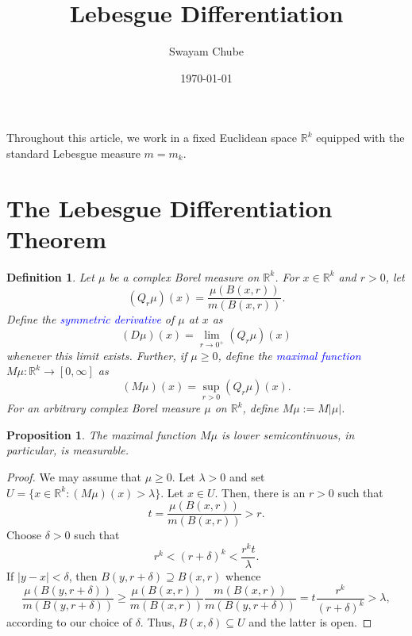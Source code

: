 \documentclass[12pt]{article}
\title{Lebesgue Differentiation}
\author{Swayam Chube}
\date{\today}
\theoremstyle{thmstyle}
\newtheorem{proposition}[theorem]{Proposition}
\theoremstyle{defstyle}
\newtheorem{definition}[theorem]{Definition}
\newcommand{\R}{\mathbb{R}}
\newcommand{\define}[1]{\textcolor{blue}{\textit{#1}}}
\renewcommand{\ge}{\geqslant}
\begin{document}
\maketitle

Throughout this article, we work in a fixed Euclidean space $\R^k$ equipped with the standard Lebesgue measure $m = m_k$.

\section{The Lebesgue Differentiation Theorem}

\begin{definition}
    Let $\mu$ be a complex Borel measure on $\R^k$. For $x\in\R^k$ and $r > 0$, let 
    \begin{equation*}
        (Q_r\mu)(x) = \frac{\mu(B(x, r))}{m(B(x, r))}.
    \end{equation*}
    Define the \define{symmetric derivative} of $\mu$ at $x$ as 
    \begin{equation*}
        (D\mu)(x) = \lim_{r\to 0^+} (Q_r\mu)(x)
    \end{equation*}
    whenever this limit exists. Further, if $\mu\ge 0$, define the \define{maximal function} $M\mu:\R^k\to[0,\infty]$ as 
    \begin{equation*}
        (M\mu)(x) = \sup_{r > 0}(Q_r\mu)(x).
    \end{equation*}
    For an arbitrary complex Borel measure $\mu$ on $\R^k$, \emph{define} $M\mu := M|\mu|$.
\end{definition}

\begin{proposition}
    The maximal function $M\mu$ is lower semicontinuous, in particular, is measurable.
\end{proposition}
\begin{proof}
    We may assume that $\mu\ge 0$. Let $\lambda > 0$ and set $U = \{x\in \R^k\colon (M\mu)(x) > \lambda\}$. Let $x\in U$. Then, there is an $r > 0$ such that 
    \begin{equation*}
        t = \frac{\mu(B(x, r))}{m(B(x, r))} > r.
    \end{equation*}
    Choose $\delta > 0$ such that 
    \begin{equation*}
        r^k < (r + \delta)^k < \frac{r^k t}{\lambda}.
    \end{equation*}
    If $|y - x| < \delta$, then $B(y, r + \delta)\supseteq B(x, r)$ whence 
    \begin{equation*}
        \frac{\mu(B(y , r + \delta))}{m(B(y, r + \delta))}\ge\frac{\mu(B(x, r))}{m(B(x, r))}\frac{m(B(x, r))}{m(B(y, r + \delta))} = t\frac{r^k}{(r + \delta)^k} > \lambda,
    \end{equation*}
    according to our choice of $\delta$. Thus, $B(x, \delta)\subseteq U$ and the latter is open.
\end{proof}
\end{document}
